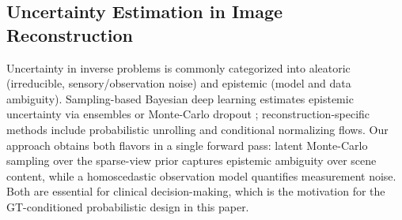 \subsection{Uncertainty Estimation in Image Reconstruction}
\label{sec:rel:unc}

Uncertainty in inverse problems is commonly categorized into aleatoric
(irreducible, sensory/observation noise) and epistemic (model and data
ambiguity). Sampling-based Bayesian deep learning estimates epistemic
uncertainty via ensembles \cite{lakshminarayanan2017deep} or
Monte-Carlo dropout \cite{gal2016dropout}; reconstruction-specific
methods include probabilistic unrolling and conditional normalizing
flows. Our approach obtains both flavors in a
single forward pass: latent Monte-Carlo sampling over the sparse-view
prior captures epistemic ambiguity over scene content, while a
homoscedastic observation model quantifies measurement noise. Both are
essential for clinical decision-making, which is the motivation for the
GT-conditioned probabilistic design in this paper.